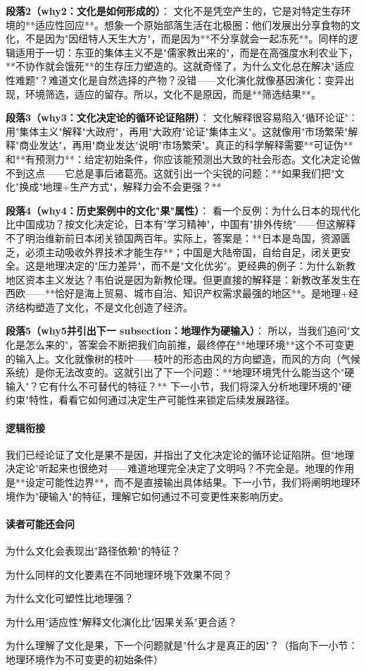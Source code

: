 \documentclass[openany, a4paper, 12pt]{book}
\begin{document}
	\textbf{段落2（why2：文化是如何形成的）}：  
	文化不是凭空产生的，它是对特定生存环境的**适应性回应**。想象一个原始部落生活在北极圈：他们发展出分享食物的文化，不是因为"因纽特人天生大方"，而是因为**不分享就会一起冻死**。同样的逻辑适用于一切：东亚的集体主义不是"儒家教出来的"，而是在高强度水利农业下，**不协作就会饿死**的生存压力塑造的。这就奇怪了，为什么文化总在解决"适应性难题"？难道文化是自然选择的产物？没错——文化演化就像基因演化：变异出现，环境筛选，适应的留存。所以，文化不是原因，而是**筛选结果**。
	
	\textbf{段落3（why3：文化决定论的循环论证陷阱）}：  
	文化解释很容易陷入"循环论证"：用"集体主义"解释"大政府"，再用"大政府"论证"集体主义"。这就像用"市场繁荣"解释"商业发达"，再用"商业发达"说明"市场繁荣"。真正的科学解释需要**可证伪**和**有预测力**：给定初始条件，你应该能预测出大致的社会形态。文化决定论做不到这点——它总是事后诸葛亮。这就引出一个尖锐的问题：**如果我们把"文化"换成"地理+生产方式"，解释力会不会更强？**
	
	\textbf{段落4（why4：历史案例中的文化"果"属性）}：  
	看一个反例：为什么日本的现代化比中国成功？按文化决定论，日本有"学习精神"，中国有"排外传统"——但这解释不了明治维新前日本闭关锁国两百年。实际上，答案是：**日本是岛国，资源匮乏，必须主动吸收外界技术才能生存**；中国是大陆帝国，自给自足，闭关更安全。这是地理决定的"压力差异"，而不是"文化优劣"。更经典的例子：为什么新教地区资本主义发达？韦伯说是因为新教伦理。但更直接的解释是：新教改革发生在西欧——**恰好是海上贸易、城市自治、知识产权需求最强的地区**。是地理+经济结构塑造了文化，不是文化创造了经济。
	
	\textbf{段落5（why5并引出下一 subsection：地理作为硬输入）}：  
	所以，当我们追问"文化是怎么来的"，答案会不断把我们向前推，最终停在**地理环境**这个不可变更的输入上。文化就像树的枝叶——枝叶的形态由风的方向塑造，而风的方向（气候系统）是你无法改变的。这就引出了下一个问题：**地理环境凭什么能当这个"硬输入"？它有什么不可替代的特征？** 下一小节，我们将深入分析地理环境的"硬约束"特性，看看它如何通过决定生产可能性来锁定后续发展路径。
	
	\paragraph*{逻辑衔接}
	我们已经论证了文化是果不是因，并指出了文化决定论的循环论证陷阱。但"地理决定论"听起来也很绝对——难道地理完全决定了文明吗？不完全是。地理的作用是**设定可能性边界**，而不是直接输出具体结果。下一小节，我们将阐明地理环境作为"硬输入"的特征，理解它如何通过不可变更性来影响历史。
	
	\paragraph*{读者可能还会问}
	\item 为什么文化会表现出"路径依赖"的特征？
	\item 为什么同样的文化要素在不同地理环境下效果不同？
	\item 为什么文化可塑性比地理强？
	\item 为什么用"适应性"解释文化演化比"因果关系"更合适？
	\item 为什么理解了文化是果，下一个问题就是"什么才是真正的因"？（指向下一小节：地理环境作为不可变更的初始条件）
	
\end{document}
